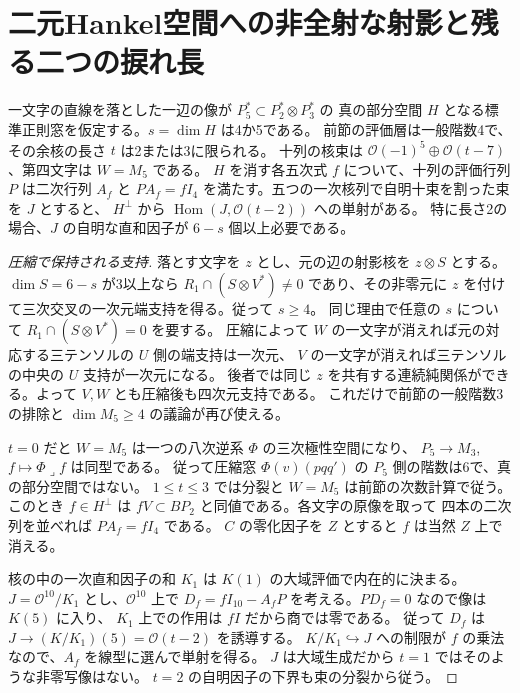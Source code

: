 \section{二元Hankel空間への非全射な射影と残る二つの捩れ長}
\label{sec:deficient-binary-support}
\begin{theorem}\label{thm:deficient-binary-support}
一文字の直線を落とした一辺の像が $P_5^*\subset P_2^*\otimes P_3^*$ の
真の部分空間 $H$ となる標準正則窓を仮定する。$s=\dim H$ は4か5である。
前節の評価層は一般階数4で、その余核の長さ $t$ は2または3に限られる。
十列の核束は $\mathcal O(-1)^5\oplus\mathcal O(t-7)$、第四文字は $W=M_5$ である。
$H$ を消す各五次式 $f$ について、十列の評価行列 $P$ は二次行列 $A_f$ と
$P A_f=fI_4$ を満たす。五つの一次核列で自明十束を割った束を $J$ とすると、
$H^\perp$ から $\operatorname{Hom}(J,\mathcal O(t-2))$ への単射がある。
特に長さ2の場合、$J$ の自明な直和因子が $6-s$ 個以上必要である。
\end{theorem}
\begin{proof}[圧縮で保持される支持]
落とす文字を $z$ とし、元の辺の射影核を $z\otimes S$ とする。
$\dim S=6-s$ が3以上なら $R_1\cap(S\otimes V^*)\ne0$ であり、その非零元に
$z$ を付けて三次交叉の一次元端支持を得る。従って $s\ge4$。
同じ理由で任意の $s$ について $R_1\cap(S\otimes V^*)=0$ を要する。
圧縮によって $W$ の一文字が消えれば元の対応する三テンソルの $U$ 側の端支持は一次元、
$V$ の一文字が消えれば三テンソルの中央の $U$ 支持が一次元になる。
後者では同じ $z$ を共有する連続純関係ができる。よって $V,W$ とも圧縮後も四次元支持である。
これだけで前節の一般階数3の排除と $\dim M_5\ge4$ の議論が再び使える。

$t=0$ だと $W=M_5$ は一つの八次逆系 $\Phi$ の三次極性空間になり、
$P_5\to M_3$, $f\mapsto\Phi\mathbin{\lrcorner}f$ は同型である。
従って圧縮窓 $\Phi(v)(pqq')$ の $P_5$ 側の階数は6で、真の部分空間ではない。
$1\le t\le3$ では分裂と $W=M_5$ は前節の次数計算で従う。
このとき $f\in H^\perp$ は $fV\subset BP_2$ と同値である。各文字の原像を取って
四本の二次列を並べれば $P A_f=fI_4$ である。
$C$ の零化因子を $Z$ とすると $f$ は当然 $Z$ 上で消える。

核の中の一次直和因子の和 $K_1$ は $K(1)$ の大域評価で内在的に決まる。
$J=\mathcal O^{10}/K_1$ とし、$\mathcal O^{10}$ 上で
$D_f=fI_{10}-A_fP$ を考える。$P D_f=0$ なので像は $K(5)$ に入り、
$K_1$ 上での作用は $fI$ だから商では零である。
従って $D_f$ は $J\to(K/K_1)(5)=\mathcal O(t-2)$ を誘導する。
$K/K_1\hookrightarrow J$ への制限が $f$ の乗法なので、$A_f$ を線型に選んで単射を得る。
$J$ は大域生成だから $t=1$ ではそのような非零写像はない。
$t=2$ の自明因子の下界も束の分裂から従う。
\end{proof}
